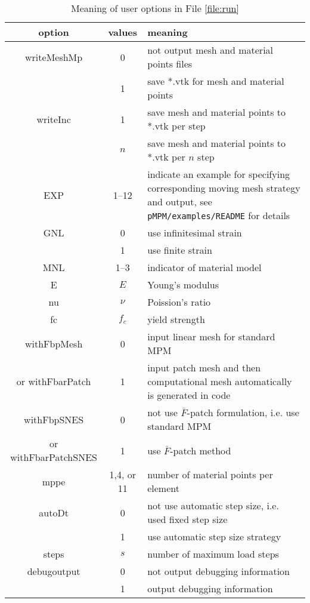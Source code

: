 \documentclass[10pt,a4paper]{article}
\newcommand{\code}[1]{\texttt{#1}}
\begin{document}
\begin{appendices}
\begin{table}[!ht]
\caption{Meaning of user options in File \ref{file:run}}
\label{tab:opt}
\begin{tabular}{ccp{}}
\toprule
option & values & meaning \\
\midrule
writeMeshMp & 0 & not output mesh and material points files \\
            & 1 & save *.vtk for mesh and material points  \\
\hline 
writeInc & 1 & save mesh and material points to *.vtk per step \\
         & $n$ & save mesh and material points to *.vtk per $n$ step \\
\hline
EXP & 1--12 & indicate an example for specifying corresponding moving mesh strategy and output, see \code{pMPM/examples/README} for details \\
\hline 
GNL & 0 & use infinitesimal strain \\
    & 1 & use finite strain \\
\hline
MNL & 1--3 & indicator of material model \\
\hline 
E & $E$ & Young's modulus \\
\hline
nu & $\nu$ & Poission's ratio \\
\hline
fc & $f_c$ & yield strength \\
\hline
withFbpMesh & 0 & input linear mesh for standard MPM \\
or withFbarPatch  & 1 & input patch mesh and then computational mesh automatically is generated in code \\
\hline
withFbpSNES & 0 & not use $\bar{F}$-patch formulation, i.e. use standard MPM \\
or withFbarPatchSNES & 1 & use $\bar{F}$-patch method \\
\hline
mppe & 1,4, or 11 & number of material points per element \\
\hline 
autoDt & 0 & not use automatic step size, i.e. used fixed step size \\
       & 1 & use automatic step size strategy \\
\hline
steps & $s$ & number of maximum load steps \\
\hline
debugoutput & 0 & not output debugging information \\
            & 1 & output debugging information \\
\bottomrule
\end{tabular}
\end{table}


 
\end{appendices}




 

\end{document}
